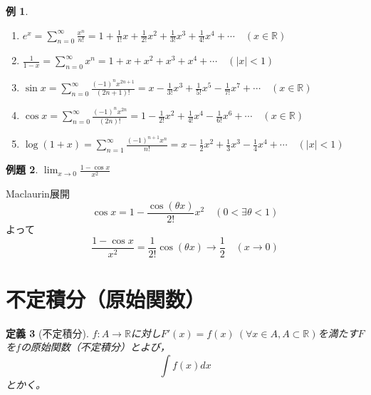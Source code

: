 \documentclass[dvipdfmx,a4j,10pt]{jsarticle}
\makeatletter
\theoremstyle{mystyle1}
\newtheorem{dfn}{定義}[part]
\newtheorem{ex}[dfn]{例題}
\newtheorem{example}[dfn]{例}
\theoremstyle{mystyle2}
\newtheorem{ans}{解答}
\renewenvironment{ans}[1][解答]{\par
  \pushQED{\qed}%
  \normalfont
  \topsep6\p@\@plus6\p@ \trivlist
  \item[\hskip\labelsep{\bfseries\sffamily #1}]\ignorespaces
}{%
  \popQED\endtrivlist\@endpefalse
}
\makeatother
\begin{document}
\newpage

\begin{shaded}
    \begin{example}\label{ex8.4}\
        \begin{enumerate}
            \item
            $\displaystyle e^x=\sum_{n=0}^\infty \frac{x^n}{n!}=1+\frac{1}{1!}x+\frac{1}{2!}x^2+\frac{1}{3!}x^3+\frac{1}{4!}x^4+\cdots\quad(x\in\mathbb{R})$
            \item
            $\displaystyle \frac{1}{1-x}=\sum_{n=0}^\infty x^n=1+x+x^2+x^3+x^4+\cdots\quad(|x|<1)$
            \item
            $\displaystyle \sin x=\sum_{n=0}^\infty\frac{(-1)^n x^{2n+1}}{(2n+1)!}=x-\frac{1}{3!}x^3+\frac{1}{5!}x^5-\frac{1}{7!}x^7+\cdots\quad(x\in\mathbb{R})$
            \item
            $\displaystyle \cos x=\sum_{n=0}^\infty\frac{(-1)^n x^{2n}}{(2n)!}=1-\frac{1}{2!}x^2+\frac{1}{4!}x^4-\frac{1}{6!}x^6+\cdots\quad(x\in\mathbb{R})$
            \item
            $\displaystyle \log{(1+x)}=\sum_{n=1}^\infty\frac{(-1)^{n+1}x^n}{n!}=x-\frac{1}{2}x^2+\frac{1}{3}x^3-\frac{1}{4}x^4+\cdots\quad(|x|<1)$
        \end{enumerate}
    \end{example}
\end{shaded}

\begin{shaded}
    \begin{ex}\label{ex8.5}
        $\displaystyle\lim_{x\to0}\frac{1-\cos{x}}{x^2}$
    \end{ex}
\end{shaded}

\begin{ans}[例題\ref{ex8.5}の解答]
    Maclaurin展開
    \[
    \cos{x}=1-\frac{\cos{(\theta x)}}{2!}x^2\quad(0<\exists\theta<1)
    \]
    よって
    \[
    \frac{1-\cos{x}}{x^2}=\frac{1}{2!}\cos{(\theta x)}\to\frac{1}{2}\quad(x\to0)
    \]
\end{ans}


\newpage

\section{不定積分（原始関数）}
\begin{framed}
    \begin{dfn}[不定積分]\label{def9.1}
        $f:A\to\mathbb{R}$に対し$F'(x)=f(x)\ (\forall x\in A,A\subset\mathbb{R})$を満たす$F$を$f$の原始関数（不定積分）とよび，
        \[
        \int f(x) dx
        \]
        とかく。
    \end{dfn}
\end{framed}
\end{document}
